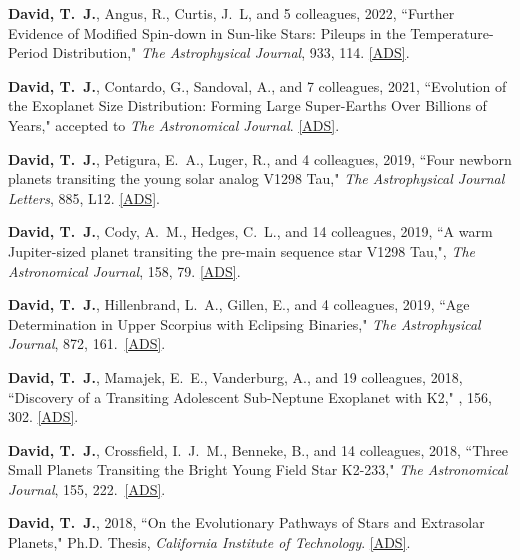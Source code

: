 \item {\bf {David}, T.~J.}, {Angus}, R., {Curtis}, J.~L, and 5 colleagues, 2022, ``{Further Evidence of Modified Spin-down in Sun-like Stars: Pileups in the Temperature-Period Distribution}," \textit{The Astrophysical Journal}, 933, 114. \href{https://ui.adsabs.harvard.edu/abs/2022ApJ...933..114D/abstract}{[ADS]}.

\item {\bf {David}, T.~J.}, {Contardo}, G., {Sandoval}, A., and 7 colleagues, 2021, ``{Evolution of the Exoplanet Size Distribution: Forming Large Super-Earths Over Billions of Years}," accepted to \textit{The Astronomical Journal}. \href{https://ui.adsabs.harvard.edu/abs/2021AJ....161..265D/abstract}{[ADS]}.

\item {\bf {David}, T.~J.}, {Petigura}, E.~A., {Luger}, R., and 4 colleagues, 2019, ``{Four newborn planets transiting the young solar analog V1298 Tau}," \textit{The Astrophysical Journal Letters}, 885, L12. \href{https://ui.adsabs.harvard.edu/abs/2019ApJ...885L..12D/abstract}{[ADS]}.

\item {\bf {David}, T.~J.}, {Cody}, A.~M., {Hedges}, C.~L., and 14 colleagues, 2019, ``{A warm Jupiter-sized planet transiting the pre-main sequence star V1298 Tau},", \textit{The Astronomical Journal}, 158, 79. \href{https://ui.adsabs.harvard.edu/abs/2019AJ....158...79D/abstract}{[ADS]}.

\item {\bf {David}, T.~J.}, {Hillenbrand}, L.~A., {Gillen}, E., and 4 colleagues, 2019, ``{Age Determination in Upper Scorpius with Eclipsing Binaries}," \textit{The Astrophysical Journal}, 872, 161.\ \href{https://ui.adsabs.harvard.edu/abs/2019ApJ...872..161D/abstract}{[ADS]}.

\item {\bf {David}, T.~J.}, {Mamajek}, E.~E., {Vanderburg}, A., and 19 colleagues, 2018, ``{Discovery of a Transiting Adolescent Sub-Neptune Exoplanet with K2}," \aj, 156, 302.  \href{https://ui.adsabs.harvard.edu/#abs/2018AJ....156..302D/}{[ADS]}. 

\item {\bf {\bf David, T.}~J.}, {Crossfield}, I.~J.~M., {Benneke}, B., and 14 colleagues, 2018, ``{Three Small Planets Transiting the Bright Young Field Star K2-233}," \textit{The Astronomical Journal}, 155, 222.\ \href{https://ui.adsabs.harvard.edu/#abs/2018AJ....155..222D/}{[ADS]}. 

\item {\bf {David}, T.~J.}, 2018, ``{On the Evolutionary Pathways of Stars and Extrasolar Planets}," Ph.D. Thesis, \textit{California Institute of Technology}. \href{https://ui.adsabs.harvard.edu/abs/2018PhDT........38D/abstract}{[ADS]}.

